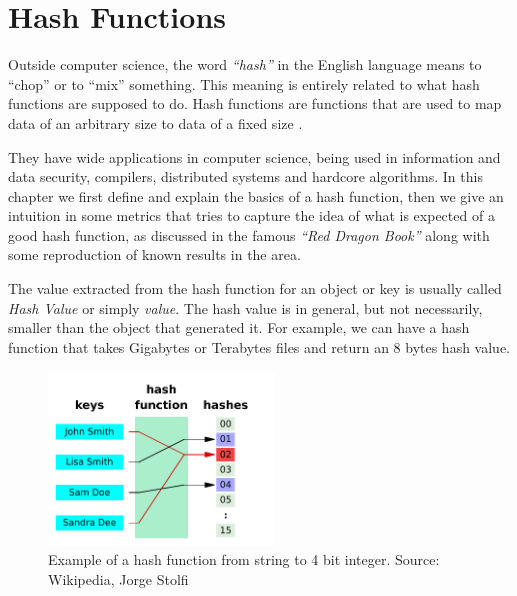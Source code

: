 \chapter{Hash Functions}
\label{cap:Hash Functions}


Outside computer science, the word \textit{``hash''} in the English language means to ``chop'' or to ``mix'' something. This meaning is entirely related to what hash functions are supposed to do. Hash functions are functions that are used to map data of an arbitrary size to data of a fixed size \citep{HashFuncWiki}.

They have wide applications in computer science, being used in information and data security, compilers, distributed systems and hardcore algorithms. In this chapter we first define and explain the basics of a hash function, then we give an intuition in some metrics that tries to capture the idea of what is expected of a good hash function, as discussed in the famous \textit{``Red Dragon Book''} \citep{DragonBook} along with some reproduction of known results in the area.

The value extracted from the hash function for an object or key is usually called \textit{Hash Value} or simply \textit{value}. The hash value is in general, but not necessarily, smaller than the object that generated it. For example, we can have a hash function that takes Gigabytes or Terabytes files and return an 8 bytes hash value.

\begin{figure}[h!]
  \centering
  \includegraphics[width=6cm]{figuras/hash-function.pdf}
  \caption{Example of a hash function from string to 4 bit integer. Source: Wikipedia, Jorge Stolfi }
\end{figure}

